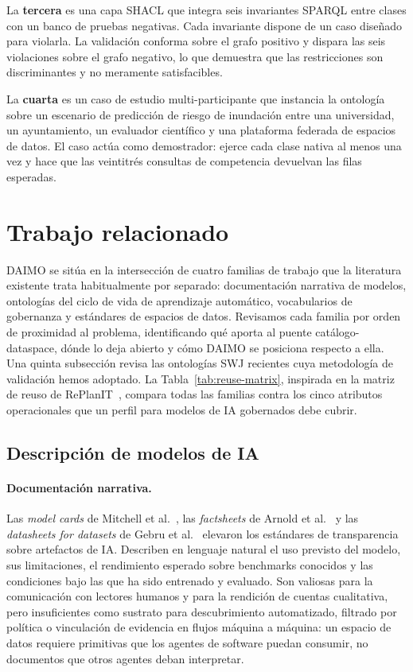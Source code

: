 \documentclass[Afour,sagev,times]{sagej}
\begin{document}
La \textbf{tercera} es una capa SHACL que integra seis invariantes SPARQL entre clases con un banco de pruebas negativas. Cada invariante dispone de un caso diseñado para violarla. La validación conforma sobre el grafo positivo y dispara las seis violaciones sobre el grafo negativo, lo que demuestra que las restricciones son discriminantes y no meramente satisfacibles.

La \textbf{cuarta} es un caso de estudio multi-participante que instancia la ontología sobre un escenario de predicción de riesgo de inundación entre una universidad, un ayuntamiento, un evaluador científico y una plataforma federada de espacios de datos. El caso actúa como demostrador: ejerce cada clase nativa al menos una vez y hace que las veintitrés consultas de competencia devuelvan las filas esperadas.

\section{Trabajo relacionado}\label{sec:related}

DAIMO se sitúa en la intersección de cuatro familias de trabajo que la literatura existente trata habitualmente por separado: documentación narrativa de modelos, ontologías del ciclo de vida de aprendizaje automático, vocabularios de gobernanza y estándares de espacios de datos. Revisamos cada familia por orden de proximidad al problema, identificando qué aporta al puente catálogo-dataspace, dónde lo deja abierto y cómo DAIMO se posiciona respecto a ella. Una quinta subsección revisa las ontologías SWJ recientes cuya metodología de validación hemos adoptado. La Tabla~\ref{tab:reuse-matrix}, inspirada en la matriz de reuso de RePlanIT~\cite{kurteva}, compara todas las familias contra los cinco atributos operacionales que un perfil para modelos de IA gobernados debe cubrir.

\subsection{Descripción de modelos de IA}

\paragraph{Documentación narrativa.}

Las \emph{model cards} de Mitchell et al.~\cite{mitchell19}, las \emph{factsheets} de Arnold et al.~\cite{arnold19} y las \emph{datasheets for datasets} de Gebru et al.~\cite{gebru21} elevaron los estándares de transparencia sobre artefactos de IA. Describen en lenguaje natural el uso previsto del modelo, sus limitaciones, el rendimiento esperado sobre benchmarks conocidos y las condiciones bajo las que ha sido entrenado y evaluado. Son valiosas para la comunicación con lectores humanos y para la rendición de cuentas cualitativa, pero insuficientes como sustrato para descubrimiento automatizado, filtrado por política o vinculación de evidencia en flujos máquina a máquina: un espacio de datos requiere primitivas que los agentes de software puedan consumir, no documentos que otros agentes deban interpretar.
\end{document}
